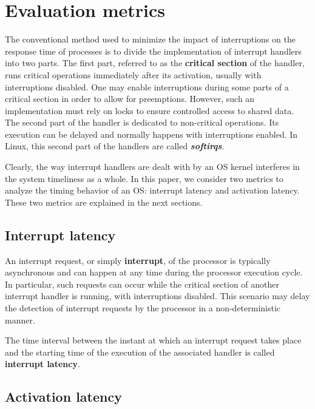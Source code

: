 \documentclass{acm_proc_article-sp}
\begin{document}
\section{Evaluation metrics}
\label{sec:compTemp}

The conventional method used to minimize the impact of interruptions on the response
time of processes is to divide the implementation of interrupt handlers into two
parts. The first part, referred to as the \textbf{critical section} of the
  handler, runs critical operations immediately after its activation, 
  usually with interruptions disabled.  One may enable interruptions during some
parts of a critical section in order to allow for preemptions. However, such an
implementation must rely on locks to ensure controlled access to shared data. The
second part of the handler is dedicated to non-critical operations. Its execution
can be delayed and normally happens with interruptions enabled. In Linux, this
second part of the handlers are called \textbf{\emph{softirqs}}.

Clearly, the way interrupt handlers are dealt with by an OS kernel interferes in the
system timeliness as a whole. In this paper, we consider two metrics to analyze the
timing behavior of an OS: interrupt latency and activation latency. These two
metrics are explained in the next sections.

\subsection{Interrupt latency}
\label{sec:latIRQ}

An interrupt request, or simply \textbf{interrupt}, of the processor 
is typically asynchronous and can happen at any time during the processor execution
cycle. In particular, such requests can occur while the critical section of another
interrupt handler is running, with interruptions disabled. This scenario may delay 
the detection of interrupt requests by the processor in a non-deterministic manner.

The time interval between the instant at which an interrupt request takes place and the
starting time of the execution of the associated handler is called \textbf{interrupt
  latency}. 

\subsection{Activation latency}
\end{document}
